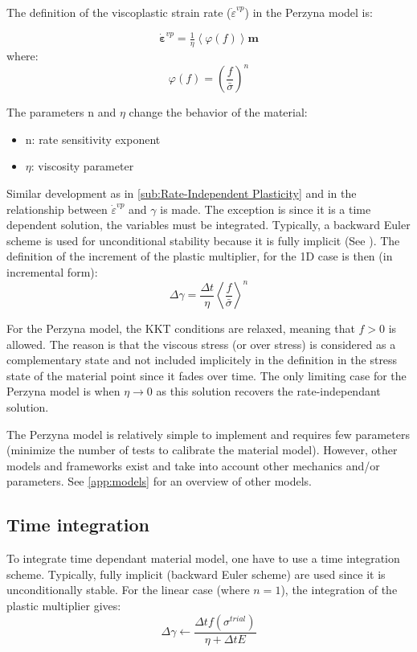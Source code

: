 \documentclass[final,5p,times,twocolumn]{elsarticle}
\begin{document}
The definition of the viscoplastic strain rate ($\dot{\varepsilon}^{vp}$) in the Perzyna model is:

\begin{equation}
  \boldsymbol{\dot{\varepsilon}}^{vp} = \tfrac{1}{\eta}\left\langle \varphi(f) \right\rangle \boldsymbol{m} \label{eq:perzyna1}
\end{equation}
where:
\begin{equation}
  \varphi(f)=\left( \dfrac{f}{\bar{\sigma}} \right)^{n}
\end{equation}

The parameters n and $\eta$ change the behavior of the material:
\begin{itemize}
  \item n: rate sensitivity exponent
  \item $\eta$: viscosity parameter
\end{itemize}

Similar development as in \cref{sub:Rate-Independent Plasticity} and in the relationship between $\dot{\varepsilon}^{vp}$ and $\gamma$ is made. The exception is since it is a time dependent solution, the variables must be integrated. Typically, a backward Euler scheme is used for unconditional stability because it is fully implicit (See \cite{MACrisfield2012,Simo1998Computational}). The definition of the increment of the plastic multiplier, for the 1D case is then (in incremental form):
\begin{equation}
  \Delta\gamma=\dfrac{\Delta t}{\eta}\left\langle \dfrac{f}{\bar{\sigma}} \right\rangle^{n}
\end{equation}

For the Perzyna model, the KKT conditions are relaxed, meaning that $f>0$ is allowed. The reason is that the viscous stress (or over stress) is considered as a complementary state and not included implicitely in the definition in the stress state of the material point since it fades over time. The only limiting case for the Perzyna model is when $\eta\rightarrow0$ as this solution recovers the rate-independant solution.

The Perzyna model is relatively simple to implement and requires few parameters (minimize the number of tests to calibrate the material model). However, other models and frameworks exist and take into account other mechanics and/or parameters. See \cref{app:models} for an overview of other models.

\subsection{Time integration}
\label{sub:timeint}
To integrate time dependant material model, one have to use a time integration scheme. Typically, fully implicit (backward Euler scheme) are used since it is unconditionally stable. For the linear case (where $n=1$), the integration of the plastic multiplier gives:
\begin{equation}
    \Delta \gamma \gets \dfrac{\Delta t f(\sigma^{trial})}{\eta +  \Delta t E}
\end{equation}
\end{document}
